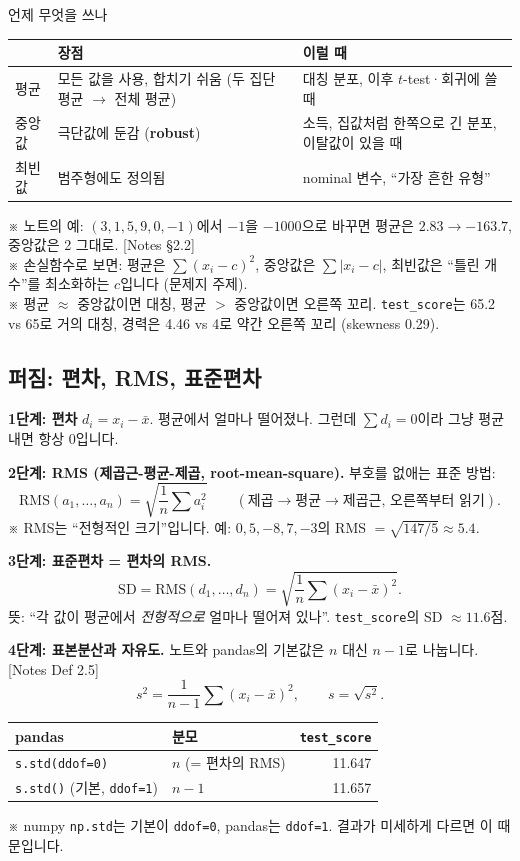 \documentclass[11pt,a4paper]{article}
\newcommand{\SD}{\mathrm{SD}}
\newcommand{\term}[1]{\textbf{#1}}
\newcommand{\code}[1]{\texttt{#1}}
\newcommand{\nref}[1]{{\footnotesize\textsf{\color{blue!55!black}[Notes #1]}}}
\newcommand{\aside}[1]{{\footnotesize\color{black!65}#1}}
\begin{document}
\begin{keybox}{언제 무엇을 쓰나}
\begin{center}
\begin{tabular}{@{}p{2cm} p{6cm} p{6cm}@{}}
\toprule
 & 장점 & 이럴 때 \\
\midrule
평균 & 모든 값을 사용, 합치기 쉬움 (두 집단 평균 $\to$ 전체 평균) & 대칭 분포, 이후 $t$-test·회귀에 쓸 때 \\
중앙값 & 극단값에 둔감 (\term{robust}) & 소득, 집값처럼 한쪽으로 긴 분포, 이탈값이 있을 때 \\
최빈값 & 범주형에도 정의됨 & nominal 변수, ``가장 흔한 유형'' \\
\bottomrule
\end{tabular}
\end{center}
\aside{※ 노트의 예: $(3,1,5,9,0,-1)$에서 $-1$을 $-1000$으로 바꾸면 평균은 $2.83\to-163.7$, 중앙값은 2 그대로. \nref{§2.2}}\\
\aside{※ 손실함수로 보면: 평균은 $\sum(x_i-c)^2$, 중앙값은 $\sum|x_i-c|$, 최빈값은 ``틀린 개수''를 최소화하는 $c$입니다 (문제지 주제).}\\
\aside{※ 평균 $\approx$ 중앙값이면 대칭, 평균 $>$ 중앙값이면 오른쪽 꼬리. \code{test\_score}는 65.2 vs 65로 거의 대칭, 경력은 4.46 vs 4로 약간 오른쪽 꼬리 (skewness 0.29).}
\end{keybox}

\subsection{퍼짐: 편차, RMS, 표준편차}
\textbf{1단계: 편차} $d_i=x_i-\bar x$. 평균에서 얼마나 떨어졌나. 그런데 $\sum d_i=0$이라 그냥 평균내면 항상 0입니다.

\textbf{2단계: RMS (제곱근-평균-제곱, root-mean-square).} 부호를 없애는 표준 방법:
\[
\text{RMS}(a_1,\dots,a_n)=\sqrt{\frac1n\sum a_i^2}\qquad(\text{제곱} \to \text{평균} \to \text{제곱근, 오른쪽부터 읽기}).
\]
\aside{※ RMS는 ``전형적인 크기''입니다. 예: $0,5,-8,7,-3$의 RMS $=\sqrt{147/5}\approx5.4$.}

\textbf{3단계: 표준편차 = 편차의 RMS.}
\[
\SD=\text{RMS}(d_1,\dots,d_n)=\sqrt{\frac1n\sum(x_i-\bar x)^2}.
\]
뜻: ``각 값이 평균에서 \emph{전형적으로} 얼마나 떨어져 있나''. \code{test\_score}의 SD $\approx11.6$점.

\textbf{4단계: 표본분산과 자유도.} 노트와 pandas의 기본값은 $n$ 대신 $n-1$로 나눕니다. \nref{Def 2.5}
\[
s^2=\frac1{n-1}\sum(x_i-\bar x)^2,\qquad s=\sqrt{s^2}.
\]
\begin{center}
\begin{tabular}{@{}l l r@{}}
\toprule
pandas & 분모 & \code{test\_score} \\
\midrule
\code{s.std(ddof=0)} & $n$ (= 편차의 RMS) & 11.647 \\
\code{s.std()} (기본, \code{ddof=1}) & $n-1$ & 11.657 \\
\bottomrule
\end{tabular}
\end{center}
\aside{※ numpy \code{np.std}는 기본이 \code{ddof=0}, pandas는 \code{ddof=1}. 결과가 미세하게 다르면 이 때문입니다.}
\end{document}
